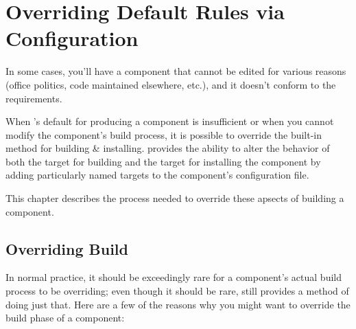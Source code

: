 %
%
%
%
\chapter{Overriding Default Rules via Configuration} \label{chap:overriding}

In some cases, you'll have a component \makefile that cannot be edited
for various reasons (office politics, code maintained elsewhere,
etc.), and it doesn't conform to the \lmsbw requirements.

When \lmsbw's default for producing a component is insufficient or
when you cannot modify the component's build process, it is possible
to override the built-in method for building \& installing.  \lmsbw
provides the ability to alter the behavior of both the \makefile
target for building and the target for installing the component by
adding particularly named targets to the component's configuration
file.


This chapter describes the process needed to override these apsects of
building a component.


\section{Overriding Build}

In normal practice, it should be exceedingly rare for a
component's actual build process to be overriding; even though it
should be rare, \lmsbw still provides a method of doing just that.
Here are a few of the reasons why you might want to override the build
phase of a component:

